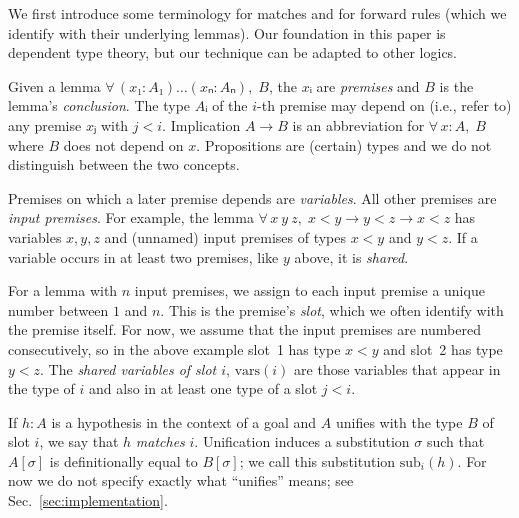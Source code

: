 \documentclass[runningheads,leqno]{llncs}
\newcommand{\All}[2]{\ensuremath{\forall\, #1,\; #2}}
\newcommand{\vars}{\ensuremath{\mathrm{vars}}}
\newcommand{\sub}{\ensuremath{\mathrm{sub}}}
\begin{document}
We first introduce some terminology for matches and for forward rules (which we identify with their underlying lemmas).
Our foundation in this paper is dependent type theory, but our technique can be adapted to other logics.

Given a lemma $\All{(x₁ : A₁) \dots (xₙ : Aₙ)}{B}$, the $xᵢ$ are \emph{premises} and $B$ is the lemma's \emph{conclusion}.
The type $Aᵢ$ of the $i$-th premise may depend on (i.e., refer to) any premise $xⱼ$ with $j < i$.
Implication $A → B$ is an abbreviation for $\All{x : A}{B}$ where $B$ does not depend on $x$.
Propositions are (certain) types and we do not distinguish between the two concepts.

Premises on which a later premise depends are \emph{variables}.
All other premises are \emph{input premises}.
For example, the lemma $\All{x~y~z}{x < y → y < z → x < z}$ has variables $x, y, z$ and (unnamed) input premises of types $x < y$ and $y < z$.
If a variable occurs in at least two premises, like $y$ above, it is \emph{shared}.

For a lemma with $n$ input premises, we assign to each input premise a unique number between $1$ and $n$.
This is the premise's \emph{slot}, which we often identify with the premise itself.
For now, we assume that the input premises are numbered consecutively, so in the above example slot~1 has type $x < y$ and slot~2 has type $y < z$.
The \emph{shared variables of slot $i$}, $\vars(i)$ are those variables that appear in the type of $i$ and also in at least one type of a slot $j < i$.

If $h : A$ is a hypothesis in the context of a goal and $A$ unifies with the type $B$ of slot $i$, we say that $h$ \emph{matches} $i$.
Unification induces a substitution $σ$ such that $A[σ]$ is definitionally equal to $B[σ]$; we call this substitution $\sub_{i}(h)$.
For now we do not specify exactly what \enquote{unifies} means; see Sec.~\ref{sec:implementation}.
\end{document}
